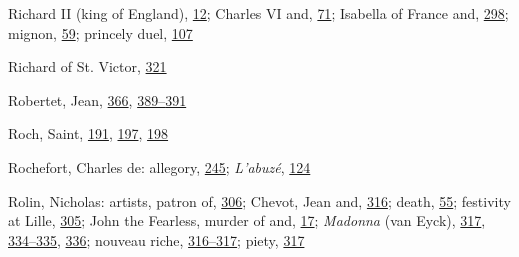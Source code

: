 Richard II (king of England),
\protect\hyperlink{08_Chapter_One__THE_PASSIONATE_INTE.xhtmlux5cux23page_12}{12};
Charles VI and,
\protect\hyperlink{10_Chapter_Three__THE_HEROIC_DREAM.xhtmlux5cux23page_71}{71};
Isabella of France and,
\protect\hyperlink{20_ILLUSTRATIONS_FOLLOW_PAGE.xhtmlux5cux23page_298}{298};
mignon,
\protect\hyperlink{09_Chapter_Two__THE_CRAVING_FOR_A_M.xhtmlux5cux23page_59}{59};
princely duel,
\protect\hyperlink{10_Chapter_Three__THE_HEROIC_DREAM.xhtmlux5cux23page_107}{107}

Richard of St. Victor,
\protect\hyperlink{20_ILLUSTRATIONS_FOLLOW_PAGE.xhtmlux5cux23page_321}{321}

Robertet, Jean,
\protect\hyperlink{21_Chapter_Thirteen__IMAGE_AND_WORD.xhtmlux5cux23page_366}{366},
\protect\hyperlink{22_Chapter_Fourteen__THE_COMING_OF.xhtmlux5cux23page_389}{389--}\protect\hyperlink{22_Chapter_Fourteen__THE_COMING_OF.xhtmlux5cux23page_391}{391}

Roch, Saint,
\protect\hyperlink{13_Chapter_Six__THE_DEPICTION_OF_TH.xhtmlux5cux23page_191}{191},
\protect\hyperlink{13_Chapter_Six__THE_DEPICTION_OF_TH.xhtmlux5cux23page_197}{197},
\protect\hyperlink{13_Chapter_Six__THE_DEPICTION_OF_TH.xhtmlux5cux23page_198}{198}

Rochefort, Charles de: allegory,
\protect\hyperlink{16_Chapter_Nine__THE_DECLINE_OF_SYM.xhtmlux5cux23page_245}{245};
\emph{L'abuzé},
\protect\hyperlink{10_Chapter_Three__THE_HEROIC_DREAM.xhtmlux5cux23page_124}{124}

Rolin, Nicholas: artists, patron of,
\protect\hyperlink{20_ILLUSTRATIONS_FOLLOW_PAGE.xhtmlux5cux23page_306}{306};
Chevot, Jean and,
\protect\hyperlink{20_ILLUSTRATIONS_FOLLOW_PAGE.xhtmlux5cux23page_316}{316};
death,
\protect\hyperlink{09_Chapter_Two__THE_CRAVING_FOR_A_M.xhtmlux5cux23page_55}{55};
festivity at Lille,
\protect\hyperlink{20_ILLUSTRATIONS_FOLLOW_PAGE.xhtmlux5cux23page_305}{305};
John the Fearless, murder of and,
\protect\hyperlink{08_Chapter_One__THE_PASSIONATE_INTE.xhtmlux5cux23page_17}{17};
\emph{Madonna} (van Eyck),
\protect\hyperlink{20_ILLUSTRATIONS_FOLLOW_PAGE.xhtmlux5cux23page_317}{317},
\protect\hyperlink{21_Chapter_Thirteen__IMAGE_AND_WORD.xhtmlux5cux23page_334}{334--}\protect\hyperlink{21_Chapter_Thirteen__IMAGE_AND_WORD.xhtmlux5cux23page_335}{335},
\protect\hyperlink{21_Chapter_Thirteen__IMAGE_AND_WORD.xhtmlux5cux23page_336}{336};
nouveau riche,
\protect\hyperlink{20_ILLUSTRATIONS_FOLLOW_PAGE.xhtmlux5cux23page_316}{316--}\protect\hyperlink{20_ILLUSTRATIONS_FOLLOW_PAGE.xhtmlux5cux23page_317}{317};
piety,
\protect\hyperlink{20_ILLUSTRATIONS_FOLLOW_PAGE.xhtmlux5cux23page_317}{317}

